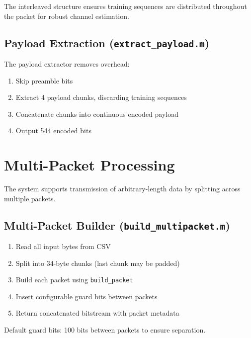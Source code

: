 \documentclass[12pt]{article}
\begin{document}
The interleaved structure ensures training sequences are distributed throughout the packet for robust channel estimation.

\subsection{Payload Extraction (\texttt{extract\_payload.m})}
The payload extractor removes overhead:
\begin{enumerate}
    \item Skip preamble bits
    \item Extract 4 payload chunks, discarding training sequences
    \item Concatenate chunks into continuous encoded payload
    \item Output 544 encoded bits
\end{enumerate}

\section{Multi-Packet Processing}

The system supports transmission of arbitrary-length data by splitting across multiple packets.

\subsection{Multi-Packet Builder (\texttt{build\_multipacket.m})}
\begin{enumerate}
    \item Read all input bytes from CSV
    \item Split into 34-byte chunks (last chunk may be padded)
    \item Build each packet using \texttt{build\_packet}
    \item Insert configurable guard bits between packets
    \item Return concatenated bitstream with packet metadata
\end{enumerate}

Default guard bits: 100 bits between packets to ensure separation.
\end{document}
